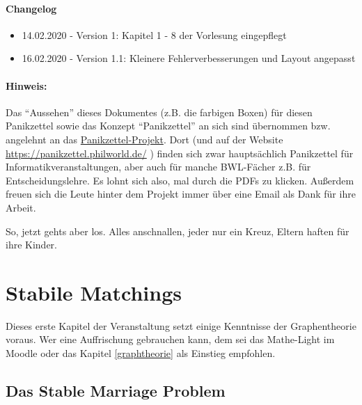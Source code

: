 \documentclass{panikzettel}
\begin{document}
\paragraph{Changelog}
\begin{itemize}
	\item 14.02.2020 - Version 1: Kapitel 1 - 8 der Vorlesung eingepflegt
	\item 16.02.2020 - Version 1.1: Kleinere Fehlerverbesserungen und Layout angepasst
\end{itemize}


{\footnotesize{}
	\paragraph{Hinweis:}
	Das ``Aussehen'' dieses Dokumentes (z.B. die farbigen Boxen) für diesen Panikzettel sowie das Konzept ``Panikzettel'' an sich sind übernommen bzw. angelehnt an das \href{https://git.rwth-aachen.de/philipp.schroer/panikzettel}{Panikzettel-Projekt}. Dort (und auf der Website \url{https://panikzettel.philworld.de/} ) finden sich zwar hauptsächlich Panikzettel für Informatikveranstaltungen, aber auch für manche BWL-Fächer z.B. für Entscheidungslehre. Es lohnt sich also, mal durch die PDFs zu klicken. Außerdem freuen sich die Leute hinter dem Projekt immer über eine Email als Dank für ihre Arbeit.}

So, jetzt gehts aber los. Alles anschnallen, jeder nur ein Kreuz, Eltern haften für ihre Kinder.

\newpage
\section{Stabile Matchings}

Dieses erste Kapitel der Veranstaltung setzt einige Kenntnisse der Graphentheorie voraus. Wer eine Auffrischung gebrauchen kann, dem sei das Mathe-Light im Moodle oder das Kapitel \ref{graphtheorie} als Einstieg empfohlen.

\subsection{Das Stable Marriage Problem}
\end{document}
